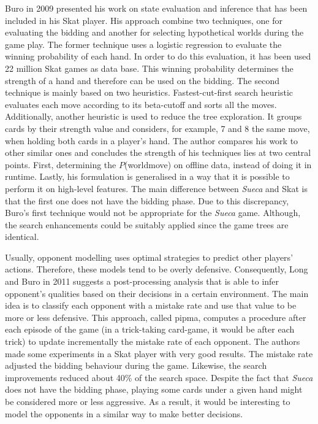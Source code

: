 Buro in 2009 \cite{Buro} presented his work on state evaluation and inference that has been included in his Skat player.
His approach combine two techniques, one for evaluating the bidding and another for selecting hypothetical worlds during the game play.
The former technique uses a logistic regression to evaluate the winning probability of each hand.
In order to do this evaluation, it has been used 22 million Skat games as data base.
This winning probability determines the strength of a hand and therefore can be used on the bidding.
The second technique is mainly based on two heuristics.
Fastest-cut-first search heuristic evaluates each move according to its beta-cutoff and sorts all the moves.
Additionally, another heuristic is used to reduce the tree exploration.
It groups cards by their strength value and considers, for example, 7 and 8 the same move, when holding both cards in a player's hand.
The author compares his work to other similar ones and concludes the strength of his techniques lies at two central points.
First, determining the $P$(world\textbar move) on offline data, instead of doing it in runtime.
Lastly, his formulation is generalised in a way that it is possible to perform it on high-level features.
The main difference between \emph{Sueca} and Skat is that the first one does not have the bidding phase.
Due to this discrepancy, Buro's first technique would not be appropriate for the \emph{Sueca} game.
Although, the search enhancements could be suitably applied since the game trees are identical.


Usually, opponent modelling uses optimal strategies to predict other players' actions.
Therefore, these models tend to be overly defensive.
Consequently, Long and Buro in 2011 \cite{Long2009} suggests a post-processing analysis that is able to infer opponent's qualities based on their decisions in a certain environment.
The main idea is to classify each opponent with a mistake rate and use that value to be more or less defensive.
This approach, called \gls{pipma}, computes a procedure after each episode of the game (in a trick-taking card-game, it would be after each trick) to update incrementally the mistake rate of each opponent.
The authors made some experiments in a Skat player with very good results.
The mistake rate adjusted the bidding behaviour during the game.
Likewise, the search improvements reduced about 40\% of the search space.
Despite the fact that \emph{Sueca} does not have the bidding phase, playing some cards under a given hand might be considered more or less aggressive.
As a result, it would be interesting to model the opponents in a similar way to make better decisions.

